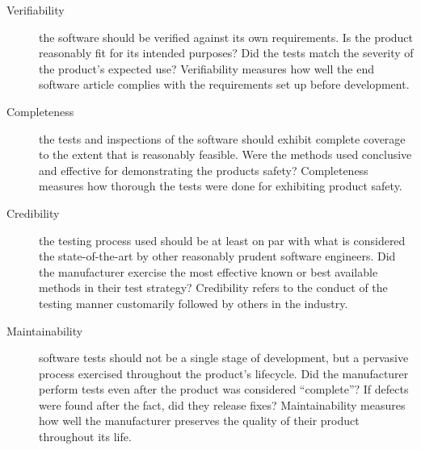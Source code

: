 \begin{description}
\item[Verifiability] the software should be verified against its own
requirements. Is the product reasonably fit for its intended purposes? Did the
tests match the severity of the product's expected use? Verifiability measures
how well the end software article complies with the requirements set up before
development.
\item[Completeness] the tests and inspections of the software should exhibit
complete coverage to the extent that is reasonably feasible. Were the methods
used conclusive and effective for demonstrating the products safety?
Completeness measures how thorough the tests were done for exhibiting product
safety.
\item[Credibility] the testing process used should be at least on par with what
is considered the state-of-the-art by other reasonably prudent software
engineers. Did the manufacturer exercise the most effective known or best
available methods in their test strategy? Credibility refers to the conduct of
the testing manner customarily followed by others in the industry.
\item[Maintainability] software tests should not be a single stage of
development, but a pervasive process exercised throughout the product's
lifecycle. Did the manufacturer perform tests even after the product was
considered ``complete''? If defects were found after the fact, did they release
fixes? Maintainability measures how well the manufacturer preserves the quality
of their product throughout its life.
\end{description}